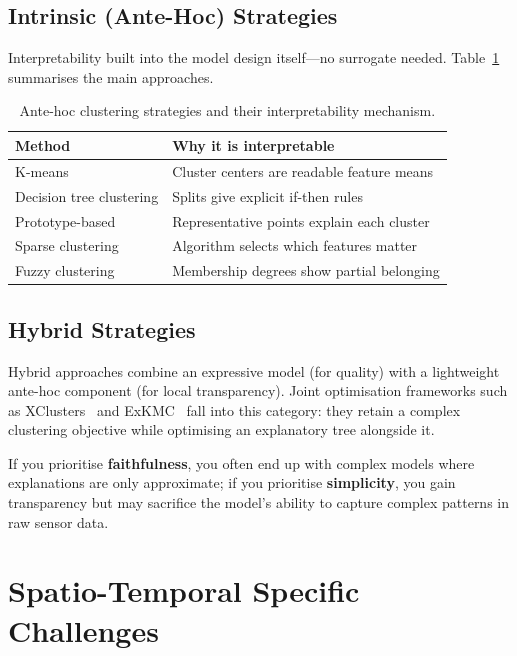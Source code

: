 \documentclass{article}
\theoremstyle{plain}
\theoremstyle{definition}
\theoremstyle{remark}
\begin{document}
\subsection{Intrinsic (Ante-Hoc) Strategies}

Interpretability built into the model design itself---no surrogate
needed. Table~\ref{tab:antehoc} summarises the main approaches.

\begin{table}[h]
\centering
\footnotesize
\setlength{\tabcolsep}{3pt}
\begin{tabular}{p{2.3cm}p{3.8cm}}
\toprule
\textbf{Method} & \textbf{Why it is interpretable} \\
\midrule
K-means & Cluster centers are readable feature means \\
Decision tree clustering & Splits give explicit if-then rules \\
Prototype-based & Representative points explain each cluster \\
Sparse clustering & Algorithm selects which features matter \\
Fuzzy clustering & Membership degrees show partial belonging \\
\bottomrule
\end{tabular}
\caption{Ante-hoc clustering strategies and their interpretability mechanism.}
\label{tab:antehoc}
\vspace{-1.2em}
\end{table}

\subsection{Hybrid Strategies}

Hybrid approaches combine an expressive model (for quality) with a
lightweight ante-hoc component (for local transparency). Joint
optimisation frameworks such as XClusters~\cite{hwang_xclusters_2023} and
ExKMC~\cite{frost_exkmc_2020} fall into this category: they retain a
complex clustering objective while optimising an explanatory tree
alongside it.

If you prioritise \textbf{faithfulness}, you often end up with complex
models where explanations are only approximate; if you prioritise
\textbf{simplicity}, you gain transparency but may sacrifice the model's
ability to capture complex patterns in raw sensor data.

\section{Spatio-Temporal Specific Challenges}
\label{sec:spatiotemporal}
\end{document}
